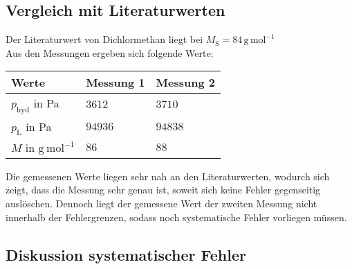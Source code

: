 \documentclass[12pt,a4paper,titlepage,headinclude,bibtotoc]{scrartcl}
\begin{document}
\subsection{Vergleich mit Literaturwerten}

Der Literaturwert von Dichlormethan liegt bei 
$M_\mathrm{S} = 84\, \mathrm{g\,mol^{-1}}$
\\


Aus den Messungen ergeben sich folgende Werte:\\


\begin{table} [h]
\centering
\begin{tabular}{|p{4 cm}||p{4 cm}|p{4 cm}|}
        \hline
		Werte & Messung 1 & Messung 2\\
         \hline 
        $ p_\mathrm{hyd}$ in Pa & $3612$  & $3710$ \\
        \hline
        $ p_\mathrm{L}   $ in Pa & $94936$  & $94838$ \\
        \hline
        $ M $ in $\mathrm{g{~}mol^{-1}}$ & $86$ & $88$ \\
        \hline     
\end{tabular}
\end{table}

Die gemessenen Werte liegen sehr nah an den Literaturwerten, wodurch sich zeigt, dass die Messung sehr genau ist, soweit sich keine Fehler gegenseitig auslöschen. Dennoch liegt der gemessene Wert der zweiten Messung nicht innerhalb der Fehlergrenzen, sodass noch systematische Fehler vorliegen müssen.

\subsection{Diskussion systematischer Fehler}
\end{document}
